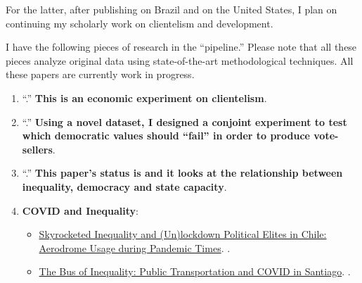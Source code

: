 \documentclass[10pt,stdletter,dateno,sigleft]{newlfm} %
\begin{document}
\begin{newlfm}
For the latter, after publishing \href{https://journals.sub.uni-hamburg.de/giga/jpla/article/view/1121/1128}{\emph{\unskip}} on Brazil and  \href{https://link.springer.com/article/10.1057/s41269-020-00174-4}{\emph{\unskip}} on the United States, I plan on continuing my scholarly work on clientelism and development. 

I have the following pieces of research in the ``pipeline.'' Please note that all these pieces analyze original data using state-of-the-art methodological techniques. All these papers are currently work in progress.

\begin{enumerate}

  \item ``\href{https://github.com/hbahamonde/Economic_Experiment_Vote_Selling/raw/master/Vote_Selling_Bahamonde_Canales_Paper.pdf}{{\unskip}}.'' {\bf This is an economic experiment on clientelism}. {\unskip}

  \item ``\href{https://github.com/hbahamonde/Conjoint_US/raw/master/Bahamonde_Quininao_Conjoint.pdf}{{\unskip}}.'' {\bf Using a novel dataset, I designed a conjoint experiment to test which democratic values should ``fail'' in order to produce vote-sellers}. {\unskip}

  \item ``\href{https://github.com/hbahamonde/Inequality_State_Capacity/raw/main/Bahamonde_Trasberg.pdf}{{\unskip}}.'' {\bf This paper's status is {\unskip} and it looks at the relationship between inequality, democracy and state capacity}. {\unskip}

  \item {\bf COVID and Inequality}:
    \begin{itemize}
      \item \href{https://raw.githubusercontent.com/hbahamonde/Tobalaba/main/abstract.txt}{Skyrocketed Inequality and (Un)lockdown Political Elites in Chile: Aerodrome Usage during Pandemic Times}. {\unskip}. 
      \item \href{https://github.com/hbahamonde/Bus/raw/main/abstract.txt}{The Bus of Inequality: Public Transportation and COVID in Santiago}. {\unskip}. 
    \end{itemize}
\end{enumerate}



\end{newlfm}
\end{document}
